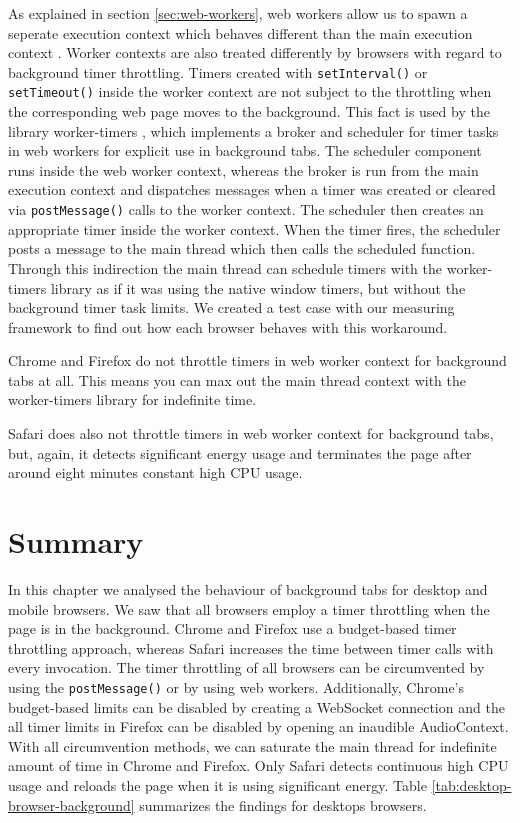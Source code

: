 \documentclass[
	ruledheaders=section,%
	class=report,%
	thesis={type=bachelor},%
	accentcolor=9c,%
	custommargins=true,%
	marginpar=false,%
	parskip=half-,%
	fontsize=11pt,%
]{tudapub}
\begin{document}
  As explained in section \ref{sec:web-workers}, web workers allow us to spawn a seperate execution context which behaves different than the main execution context \cite{mdn-worker}. Worker contexts are also treated differently by browsers with regard to background timer throttling. Timers created with \texttt{setInterval()} or \texttt{setTimeout()} inside the worker context are not subject to the throttling when the corresponding web page moves to the background. This fact is used by the library worker-timers \cite{worker-timers}, which implements a broker and scheduler for timer tasks in web workers for explicit use in background tabs. The scheduler component runs inside the web worker context, whereas the broker is run from the main execution context and dispatches messages when a timer was created or cleared via \texttt{postMessage()} calls to the worker context. The scheduler then creates an appropriate timer inside the worker context. When the timer fires, the scheduler posts a message to the main thread which then calls the scheduled function. Through this indirection the main thread can schedule timers with the worker-timers library as if it was using the native window timers, but without the background timer task limits. We created a test case with our measuring framework to find out how each browser behaves with this workaround.
  
  Chrome and Firefox do not throttle timers in web worker context for background tabs at all. This means you can max out the main thread context with the worker-timers library for indefinite time.

  Safari does also not throttle timers in web worker context for background tabs, but, again, it detects significant energy usage and terminates the page after around eight minutes constant high CPU usage. 
  
  
  \section{Summary}

  In this chapter we analysed the behaviour of background tabs for desktop and mobile browsers. We saw that all browsers employ a timer throttling when the page is in the background. Chrome and Firefox use a budget-based timer throttling approach, whereas Safari increases the time between timer calls with every invocation. The timer throttling of all browsers can be circumvented by using the \texttt{postMessage()} or by using web workers. Additionally, Chrome's budget-based limits can be disabled by creating a WebSocket connection and the all timer limits in Firefox can be disabled by opening an inaudible AudioContext. With all circumvention methods, we can saturate the main thread for indefinite amount of time in Chrome and Firefox. Only Safari detects continuous high CPU usage and reloads the page when it is using significant energy. Table \ref{tab:desktop-browser-background} summarizes the findings for desktops browsers.
\end{document}
